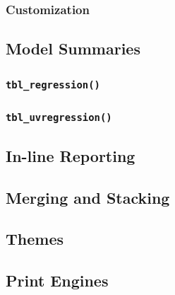 \documentclass[
]{article}
\begin{document}
\hypertarget{customization}{%
\subsubsection{Customization}\label{customization}}

\hypertarget{model-summaries}{%
\subsection{Model Summaries}\label{model-summaries}}

\hypertarget{tbl_regression}{%
\subsubsection{\texorpdfstring{\texttt{tbl\_regression()}}{tbl\_regression()}}\label{tbl_regression}}

\hypertarget{tbl_uvregression}{%
\subsubsection{\texorpdfstring{\texttt{tbl\_uvregression()}}{tbl\_uvregression()}}\label{tbl_uvregression}}

\hypertarget{in-line-reporting}{%
\subsection{In-line Reporting}\label{in-line-reporting}}

\hypertarget{merging-and-stacking}{%
\subsection{Merging and Stacking}\label{merging-and-stacking}}

\hypertarget{themes}{%
\subsection{Themes}\label{themes}}

\hypertarget{print-engines}{%
\subsection{Print Engines}\label{print-engines}}
\end{document}
